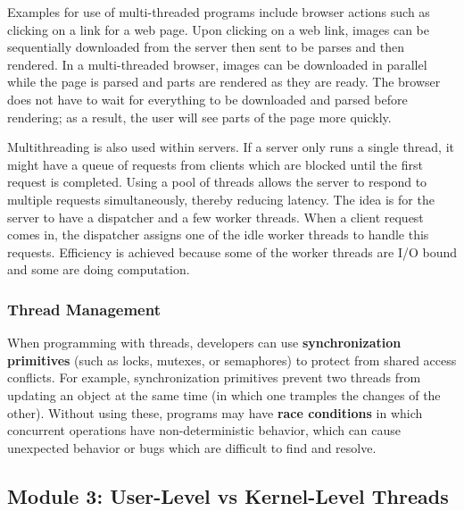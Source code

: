 \documentclass[twoside]{article}
\begin{document}
Examples for use of multi-threaded programs include browser actions such as clicking on a link for a web page. Upon clicking on a web link, images can be sequentially downloaded from the server then sent to be parses and then rendered. In a multi-threaded browser, images can be downloaded in parallel while the page is parsed and parts are rendered as they are ready. The browser does not have to wait for everything to be downloaded and parsed before rendering; as a result, the user will see parts of the page more quickly. 

Multithreading is also used within servers. If a server only runs a single thread, it might have a queue of requests from clients which are blocked until the first request is completed. Using a pool of threads allows the server to respond to multiple requests simultaneously, thereby reducing latency. The idea is for the server to have a dispatcher and a few worker threads. When a client request comes in, the dispatcher assigns one of the idle worker threads to handle this requests. Efficiency is achieved because some of the worker threads are I/O bound and some are doing computation.

\subsubsection{Thread Management}
When programming with threads, developers can use \textbf{synchronization primitives} (such as locks, mutexes, or semaphores) to protect from shared access conflicts. For example, synchronization primitives prevent two threads from updating an object at the same time (in which one tramples the changes of the other). Without using these, programs may have \textbf{race conditions} in which concurrent operations have non-deterministic behavior, which can cause unexpected behavior or bugs which are difficult to find and resolve. 

\subsection{Module 3: User-Level vs Kernel-Level Threads}
\end{document}
